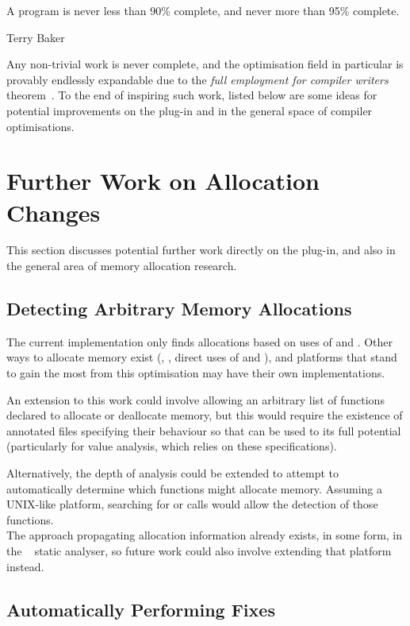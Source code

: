 \epigraph{A program is never less than 90\% complete, and never more than 95\% complete.}{Terry Baker}

Any non-trivial work is never complete, and the optimisation field in particular is provably endlessly expandable due to the \textit{full employment for compiler writers} theorem~\cite{compilerimpl}. To the end of inspiring such work, listed below are some ideas for potential improvements on the  plug-in and in the general space of compiler optimisations.

\section{Further Work on Allocation Changes}

This section discusses potential further work directly on the  plug-in, and also in the general area of memory allocation research.

\subsection{Detecting Arbitrary Memory Allocations}

The current implementation only finds allocations based on uses of \malloc{} and \free{}. Other ways to allocate memory exist (, , direct uses of  and ), and platforms that stand to gain the most from this optimisation may have their own implementations.

An extension to this work could involve allowing an arbitrary list of functions declared to allocate or deallocate memory, but this would require the existence of annotated files specifying their behaviour so that  can be used to its full potential (particularly for value analysis, which relies on these specifications).

Alternatively, the depth of analysis could be extended to attempt to automatically determine which functions might allocate memory. Assuming a UNIX-like platform, searching for  or  calls would allow the detection of those functions.\\
The approach propagating allocation information already exists, in some form, in the ~\cite{fbinfer} static analyser, so future work could also involve extending that platform instead.

\subsection{Automatically Performing Fixes}

